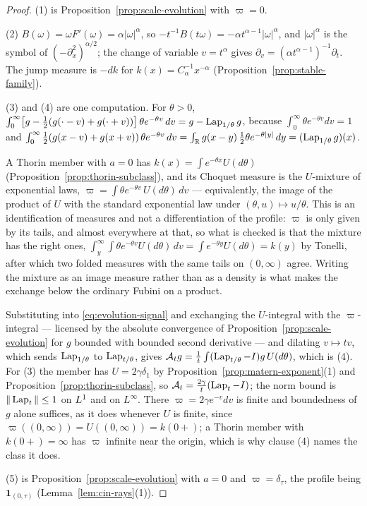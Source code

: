 \begin{proof}
(1) is Proposition~\ref{prop:scale-evolution} with $\varpi = 0$.

(2) $B(\omega) = \omega F'(\omega) = \alpha|\omega|^\alpha$, so
$-t^{-1}B(t\omega) = -\alpha t^{\alpha-1}|\omega|^\alpha$, and $|\omega|^\alpha$ is the symbol
of $(-\partial_x^2)^{\alpha/2}$; the change of variable $v = t^\alpha$ gives
$\partial_v = (\alpha t^{\alpha-1})^{-1}\partial_t$. The jump measure is $-dk$ for
$k(x) = C_\alpha^{-1}x^{-\alpha}$ (Proposition~\ref{prop:stable-family}).

(3) and (4) are one computation. For $\theta > 0$,
$\int_0^\infty \bigl[g - \tfrac12(g(\cdot - v) + g(\cdot + v))\bigr]\,\theta e^{-\theta v}\,dv
= g - \operatorname{Lap}_{1/\theta}g$, because $\int_0^\infty \theta e^{-\theta v}dv = 1$ and
$\int_0^\infty \tfrac12(g(x-v)+g(x+v))\,\theta e^{-\theta v}\,dv
= \int_{\mathbb{R}} g(x-y)\,\tfrac12\theta e^{-\theta|y|}\,dy = (\operatorname{Lap}_{1/\theta}g)(x)$.

A Thorin member with $a = 0$ has $k(x) = \int e^{-\theta x}U(d\theta)$
(Proposition~\ref{prop:thorin-subclass}), and its Choquet measure is the $U$-mixture of
exponential laws, $\varpi = \int \theta e^{-\theta v}\,U(d\theta)\,dv$ --- equivalently, the
image of the product of $U$ with the standard exponential law under
$(\theta,u) \mapsto u/\theta$. This is an identification of measures and not a differentiation
of the profile: $\varpi$ is only given by its tails, and almost everywhere at that, so what is
checked is that the mixture has the right ones,
$\int_y^\infty\!\int \theta e^{-\theta v}U(d\theta)\,dv = \int e^{-\theta y}U(d\theta) = k(y)$
by Tonelli, after which two folded measures with the same tails on $(0,\infty)$ agree. Writing
the mixture as an image measure rather than as a density is what makes the exchange below the
ordinary Fubini on a product.

Substituting into \ref{eq:evolution-signal} and exchanging the $U$-integral with the
$\varpi$-integral --- licensed by the absolute convergence of
Proposition~\ref{prop:scale-evolution} for $g$ bounded with bounded second derivative --- and
dilating $v \mapsto tv$, which sends $\operatorname{Lap}_{1/\theta}$ to $\operatorname{Lap}_{t/\theta}$, gives
$\mathcal{A}_tg = \tfrac1t\int (\operatorname{Lap}_{t/\theta} - I)g\,U(d\theta)$, which is (4). For (3) the
\Matern{} member has $U = 2\gamma\delta_1$ by Proposition~\ref{prop:matern-exponent}(1) and
Proposition~\ref{prop:thorin-subclass}, so $\mathcal{A}_t = \tfrac{2\gamma}{t}(\operatorname{Lap}_t - I)$; the
norm bound is $\|\operatorname{Lap}_t\| \le 1$ on $L^1$ and on $L^\infty$. There $\varpi = 2\gamma e^{-v}dv$
is finite and boundedness of $g$ alone suffices, as it does whenever $U$ is finite, since
$\varpi((0,\infty)) = U((0,\infty)) = k(0{+})$; a Thorin member with $k(0{+}) = \infty$ has
$\varpi$ infinite near the origin, which is why clause (4) names the class it does.

(5) is Proposition~\ref{prop:scale-evolution} with $a = 0$ and $\varpi = \delta_\tau$, the
profile being $\mathbf 1_{(0,\tau)}$ (Lemma~\ref{lem:cin-rays}(1)).
\end{proof}
